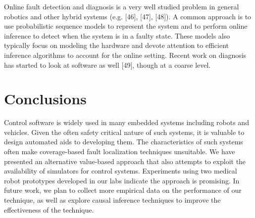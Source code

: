 Online fault detection and diagnosis is a very well studied problem in general robotics and other hybrid systems (e.g. [46], [47], [48]). A common approach is to use probabilistic sequence models to represent the system and to perform online inference to detect when the system is in a faulty state. These models also typically focus on modeling the hardware and devote attention to efficient inference algorithms to account for the online setting. Recent work on diagnosis has started to look at software as well [49], though at a coarse level.

\section{Conclusions}
Control software is widely used in many embedded systems including robots and vehicles. Given the often safety critical nature of such systems, it is valuable to design automated aids to developing them. The characteristics of such systems often make coverage-based fault localization techniques unsuitable. We have presented an alternative value-based approach that also attempts to exploit the availability of simulators for control systems. Experiments using two medical robot prototypes developed in our labs indicate the approach is promising. In future work, we plan to collect more empirical data on the performance of our technique, as well as explore causal inference techniques to improve the effectiveness of the technique.
